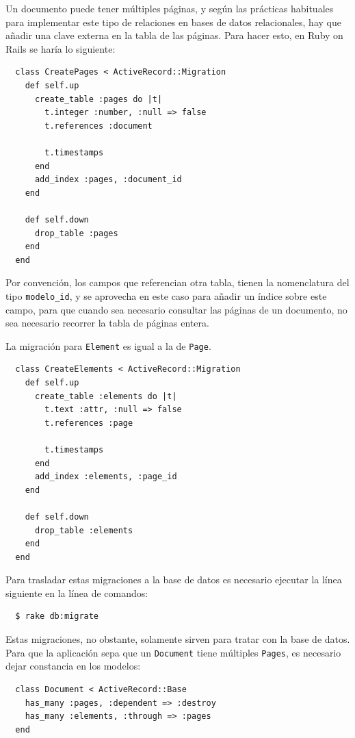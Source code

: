 Un documento puede tener múltiples páginas, y según las prácticas habituales para implementar este tipo de relaciones en bases de datos relacionales, hay que añadir una clave externa en la tabla de las páginas. Para hacer esto, en Ruby on Rails se haría lo siguiente:

\begin{verbatim}
  class CreatePages < ActiveRecord::Migration
    def self.up
      create_table :pages do |t|
        t.integer :number, :null => false
        t.references :document
        
        t.timestamps
      end
      add_index :pages, :document_id
    end

    def self.down
      drop_table :pages
    end
  end
\end{verbatim}

Por convención, los campos que referencian otra tabla, tienen la nomenclatura del tipo \texttt{modelo\_id}, y se aprovecha en este caso para añadir un índice sobre este campo, para que cuando sea necesario consultar las páginas de un documento, no sea necesario recorrer la tabla de páginas entera.

La migración para \texttt{Element} es igual a la de \texttt{Page}.

\begin{verbatim}
  class CreateElements < ActiveRecord::Migration
    def self.up
      create_table :elements do |t|
        t.text :attr, :null => false 
        t.references :page

        t.timestamps
      end
      add_index :elements, :page_id
    end

    def self.down
      drop_table :elements
    end
  end
\end{verbatim}

Para trasladar estas migraciones a la base de datos es necesario ejecutar la línea siguiente en la línea de comandos:

\begin{verbatim}
  $ rake db:migrate
\end{verbatim}

Estas migraciones, no obstante, solamente sirven para tratar con la base de datos. Para que la aplicación sepa que un \texttt{Document} tiene múltiples \texttt{Pages}, es necesario dejar constancia en los modelos:

\begin{verbatim}
  class Document < ActiveRecord::Base
    has_many :pages, :dependent => :destroy
    has_many :elements, :through => :pages
  end
\end{verbatim}

